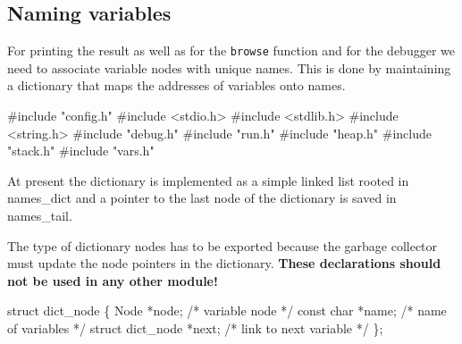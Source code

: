 %
%
\subsection{Naming variables}
For printing the result as well as for the \texttt{browse} function
and for the debugger we need to associate variable nodes with unique
names. This is done by maintaining a dictionary that maps the
addresses of variables onto names.

\nwenddocs{}\endmoddef\nwstartdeflinemarkup{}\nwenddeflinemarkup
#include "config.h"
#include <stdio.h>
#include <stdlib.h>
#include <string.h>
#include "debug.h"
#include "run.h"
#include "heap.h"
#include "stack.h"
#include "vars.h"

\nwendcode{}\nwdocspar
At present the dictionary is implemented as a simple linked list
rooted in {\Tt{}names{\_}dict\nwendquote} and a pointer to the last node of the
dictionary is saved in {\Tt{}names{\_}tail\nwendquote}.

The type of dictionary nodes has to be exported because the garbage
collector must update the node pointers in the
dictionary. \textbf{These declarations should not be used in any other
module!}


\nwenddocs{}\endmoddef\nwstartdeflinemarkup{}\nwenddeflinemarkup
struct dict_node \{
    Node             *node;             /* variable node         */
    const char       *name;             /* name of variables     */
    struct dict_node *next;             /* link to next variable */
\};

